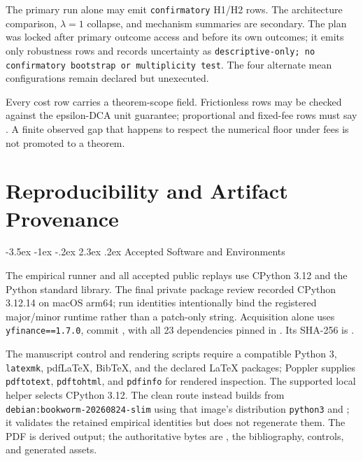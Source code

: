 \documentclass[12pt,a4paper,oneside]{report}
\makeatletter
\renewcommand\section{\@startsection{section}{1}{\z@}%
  {-3.5ex \@plus -1ex \@minus -.2ex}%
  {2.3ex \@plus .2ex}%
  {\normalfont\fontsize{14}{17}\selectfont\bfseries}}
\makeatother
\begin{document}
\begin{sloppypar}
The primary run alone may emit \texttt{confirmatory} H1/H2 rows. The
architecture comparison, $\lambda=1$ collapse, and mechanism summaries are
secondary. The plan
was locked after primary outcome access and before its own outcomes; it emits
only robustness rows and records uncertainty as
\texttt{descriptive-only; no confirmatory bootstrap or multiplicity test}.
The four alternate mean configurations remain declared but unexecuted.
\end{sloppypar}

Every cost row carries a theorem-scope field. Frictionless rows may be checked
against the epsilon-DCA unit guarantee; proportional and fixed-fee rows must
say . A finite observed gap that happens
to respect the numerical floor under fees is not promoted to a theorem.

\chapter{Reproducibility and Artifact Provenance}
\label{app:reproducibility}

\section{Accepted Software and Environments}
\label{sec:appendix-software-environments}

The empirical runner and all accepted public replays use CPython 3.12 and the
Python standard library. The final private package review recorded CPython
3.12.14 on macOS arm64; run identities intentionally bind the registered
major/minor runtime rather than a patch-only string. Acquisition alone uses
\texttt{yfinance==1.7.0}, commit
, with all 23 dependencies
pinned in . Its SHA-256 is
.

The manuscript control and rendering scripts require a compatible Python 3,
\texttt{latexmk}, pdfLaTeX, BibTeX, and the declared LaTeX packages; Poppler
supplies \texttt{pdftotext}, \texttt{pdftohtml}, and \texttt{pdfinfo} for
rendered inspection. The supported local helper selects CPython 3.12. The
clean route instead builds from \texttt{debian:bookworm-20260824-slim} using
that image's distribution \texttt{python3} and
; it validates the retained empirical
identities but does not regenerate them. The PDF is derived output; the
authoritative bytes are , the bibliography,
controls, and generated assets.
\end{document}
